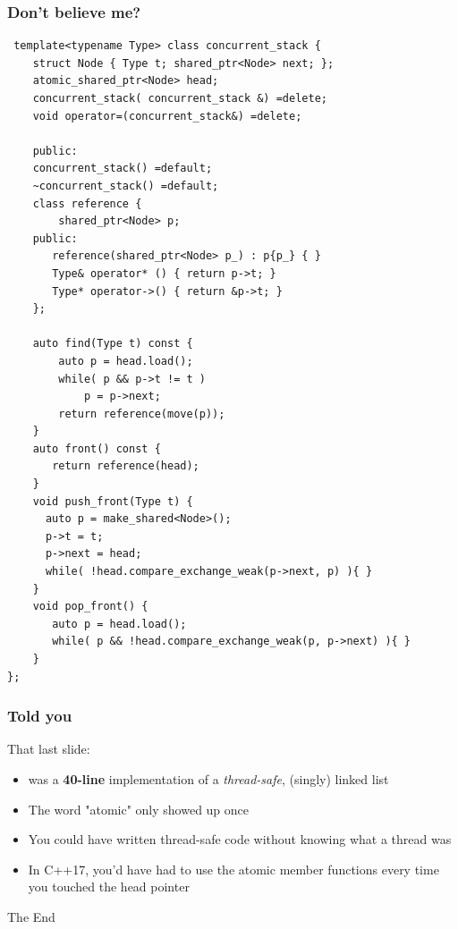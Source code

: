 \documentclass{beamer}
\begin{document}
\begin{frame}[fragile]
\frametitle{Don't believe me?}

\begin{multicols}{2}
\begin{lstlisting}
 template<typename Type> class concurrent_stack {
    struct Node { Type t; shared_ptr<Node> next; };
    atomic_shared_ptr<Node> head;
    concurrent_stack( concurrent_stack &) =delete;
    void operator=(concurrent_stack&) =delete;
    
    public:
    concurrent_stack() =default;
    ~concurrent_stack() =default;
    class reference {
        shared_ptr<Node> p;
    public:
       reference(shared_ptr<Node> p_) : p{p_} { }
       Type& operator* () { return p->t; }
       Type* operator->() { return &p->t; }
    };
    
    auto find(Type t) const {
        auto p = head.load();  
        while( p && p->t != t )
            p = p->next;
        return reference(move(p));
    }
    auto front() const {
       return reference(head); 
    }
    void push_front(Type t) {
      auto p = make_shared<Node>();
      p->t = t;
      p->next = head;         
      while( !head.compare_exchange_weak(p->next, p) ){ }
    }
    void pop_front() {
       auto p = head.load();
       while( p && !head.compare_exchange_weak(p, p->next) ){ }
    }
};

\end{lstlisting}
\columnbreak
\end{multicols}
\end{frame}

\begin{frame}
\frametitle{Told you}

That last slide:

\begin{itemize}
\setlength\itemsep{2em}
\item was a 
\textbf{40-line} implementation of a \emph{thread-safe}, (singly) linked list
\item The word "atomic" only showed up once
\item You could have written thread-safe code without knowing what a thread was
\item In C++17, you'd have had to use the atomic member functions every time you touched the head pointer
\end{itemize}

\end{frame}

\begin{frame}
\Huge{\centerline{The End}}
\end{frame}
\end{document}
